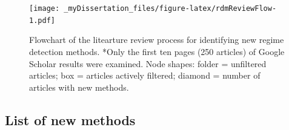 \documentclass[12pt,twoside,openany]{reedthesis}
\newenvironment{Shaded}{\begin{snugshade}}{\end{snugshade}}
\newcommand{\CommentTok}[1]{\textcolor[rgb]{0.56,0.35,0.01}{\textit{#1}}}
\newcommand{\DataTypeTok}[1]{\textcolor[rgb]{0.13,0.29,0.53}{#1}}
\newcommand{\KeywordTok}[1]{\textcolor[rgb]{0.13,0.29,0.53}{\textbf{#1}}}
\newcommand{\NormalTok}[1]{#1}
\newcommand{\OperatorTok}[1]{\textcolor[rgb]{0.81,0.36,0.00}{\textbf{#1}}}
\newcommand{\StringTok}[1]{\textcolor[rgb]{0.31,0.60,0.02}{#1}}
\begin{document}
\begin{figure}
\centering
\texttt{[image: \_myDissertation\_files/figure-latex/rdmReviewFlow-1.pdf]}
\caption{\label{fig:rdmReviewFlow}Flowchart of the litearture review process for identifying new regime detection methods. *Only the first ten pages (250 articles) of Google Scholar results were examined. Node shapes: folder = unfiltered articles; box = articles actively filtered; diamond = number of articles with new methods.}
\end{figure}
\hypertarget{list-of-new-methods}{%
\subsection{List of new methods}\label{list-of-new-methods}}
\begin{Shaded}
\end{Shaded}
\end{document}
